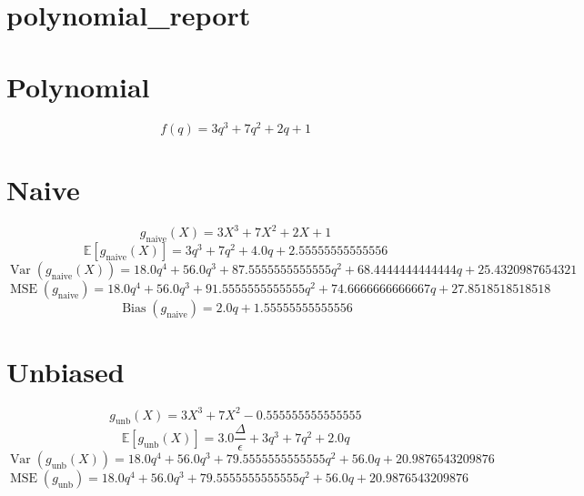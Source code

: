 \documentclass{article}
\begin{document}
\section*{polynomial_report}
\section*{Polynomial}
\begin{dmath*}
f(q) = 3 q^{3} + 7 q^{2} + 2 q + 1
\end{dmath*}
\section*{Naive}
\begin{dmath*}
g_{\mathrm{naive}}(X) = 3 X^{3} + 7 X^{2} + 2 X + 1
\end{dmath*}
\begin{dmath*}
\mathbb{E}[g_{\mathrm{naive}}(X)] = 3 q^{3} + 7 q^{2} + 4.0 q + 2.55555555555556
\end{dmath*}
\begin{dmath*}
\operatorname{Var}(g_{\mathrm{naive}}(X)) = 18.0 q^{4} + 56.0 q^{3} + 87.5555555555555 q^{2} + 68.4444444444444 q + 25.4320987654321
\end{dmath*}
\begin{dmath*}
\operatorname{MSE}(g_{\mathrm{naive}}) = 18.0 q^{4} + 56.0 q^{3} + 91.5555555555555 q^{2} + 74.6666666666667 q + 27.8518518518518
\end{dmath*}
\begin{dmath*}
\operatorname{Bias}(g_{\mathrm{naive}}) = 2.0 q + 1.55555555555556
\end{dmath*}
\section*{Unbiased}
\begin{dmath*}
g_{\mathrm{unb}}(X) = 3 X^{3} + 7 X^{2} - 0.555555555555555
\end{dmath*}
\begin{dmath*}
\mathbb{E}[g_{\mathrm{unb}}(X)] = 3.0 {\frac{\Delta}{\epsilon}} + 3 q^{3} + 7 q^{2} + 2.0 q
\end{dmath*}
\begin{dmath*}
\operatorname{Var}(g_{\mathrm{unb}}(X)) = 18.0 q^{4} + 56.0 q^{3} + 79.5555555555555 q^{2} + 56.0 q + 20.9876543209876
\end{dmath*}
\begin{dmath*}
\operatorname{MSE}(g_{\mathrm{unb}}) = 18.0 q^{4} + 56.0 q^{3} + 79.5555555555555 q^{2} + 56.0 q + 20.9876543209876
\end{dmath*}
\end{document}
